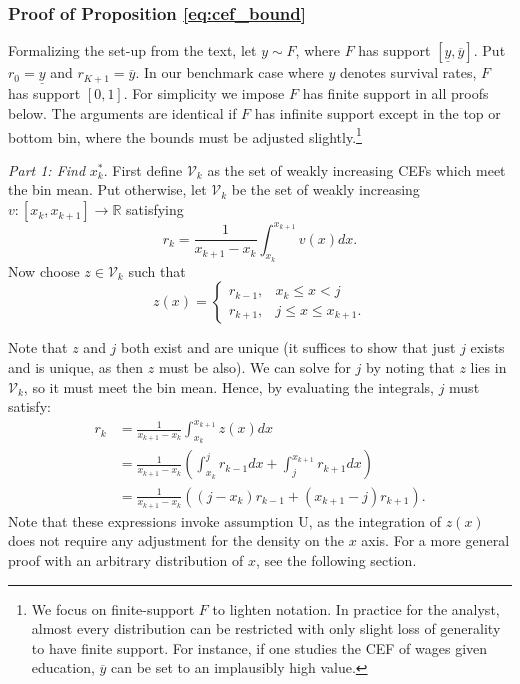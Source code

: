 \subsubsection{Proof of Proposition \ref{eq:cef_bound}}
Formalizing the set-up from the text, let $y \sim F$, where
$F$ has support $[\underline{y},\overline{y}]$. Put $r_0 =
\underline{y}$ and $r_{K+1} = \overline{y}$. In our benchmark case 
where $y$ denotes survival rates, $F$ has support $[0,1]$. For simplicity we impose $F$ has
finite support in all proofs below. The arguments are identical if $F$
has infinite support except in the top or bottom bin, where the
bounds must be adjusted slightly.\footnote{We focus on finite-support $F$ to lighten
  notation. In practice for
  the analyst, almost every distribution can be restricted with only
  slight loss of generality to have finite support. For instance, if one
  studies the CEF of wages given education, $\overline{y}$ can be set
  to an implausibly high value.}

\textit{Part 1: Find} $x_k^*$. First define $\mathcal{V}_k$ as the
set of weakly increasing CEFs which meet the bin mean. Put
otherwise, let $\mathcal{V}_k$ be the set of weakly increasing $v: [x_k,x_{k+1}] \to \mathbb{R}$
satisfying $$r_k = 
\frac{1}{x_{k+1} - x_k} \int_{x_k}^{x_{k+1}} v(x) dx.$$ 
Now choose $z \in \mathcal{V}_k$ such that 
$$
z(x) = \begin{cases} 
r_{k-1}, & x_k \leq x < j \\
r_{k+1}, & j \leq x \leq x_{k+1}.
\end{cases} 
$$

Note that $z$ and $j$
both exist and are unique (it suffices to show that just $j$ exists
and is unique, as then $z$ must be also). We can solve for $j$ by
noting that $z$ lies in $\mathcal{V}_k$, so it must meet the bin mean. Hence, by
evaluating the integrals, $j$ must satisfy: 
\begin{align*}
r_k &= \frac{1}{x_{k+1} - x_k} \int_{x_k}^{x_{k+1}} z(x) dx \\
&= \frac{1}{x_{k+1} - x_k} \left(\int_{x_k}^{j} r_{k-1} dx
+  \int_{j}^{x_{k+1}} r_{k+1} dx \right) \\ 
&= \frac{1}{x_{k+1} - x_k} \left( \left(j - x_k\right)
r_{k-1} + \left(x_{k+1} - j\right) r_{k+1} \right). 
\end{align*}
Note that these expressions invoke assumption U, as the integration
of $z(x)$ does not require any adjustment for the density on the $x$ axis. For a
more general proof with an arbitrary distribution of $x$, see the
following section. 

